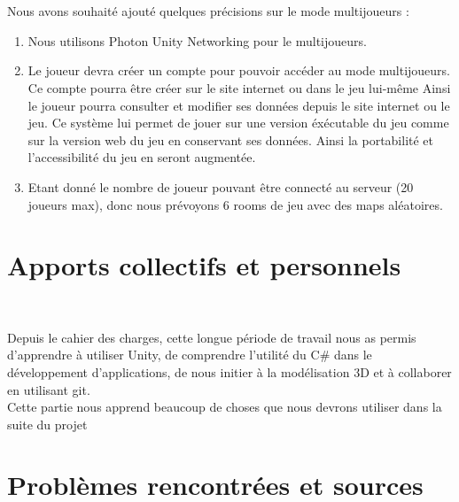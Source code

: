 \documentclass[titlepage, 13px, a4paper]{article}
\begin{document}
\paragraph{} \hspace{0pt} \\
Nous avons souhaité ajouté quelques précisions sur le mode multijoueurs :
\\
{\begin{enumerate}
	\item Nous utilisons Photon Unity Networking pour le multijoueurs.
		\\
	\item Le joueur devra créer un compte pour pouvoir accéder au mode multijoueurs.
			Ce compte pourra être créer sur le site internet ou dans le jeu lui-même
			Ainsi le joueur pourra consulter et modifier ses données depuis le site internet ou le jeu.
			Ce système lui permet de jouer sur une version éxécutable du jeu comme sur la version web du jeu en conservant ses données.
			Ainsi la portabilité et l'accessibilité du jeu en seront augmentée.
		\\
	\item Etant donné le nombre de joueur pouvant être connecté au serveur (20 joueurs max), donc nous prévoyons 6 rooms de jeu avec des maps aléatoires.
		\\
\end{enumerate}}


\part{Apports collectifs et personnels}
\paragraph{} \hspace{0pt} \\
Depuis le cahier des charges, cette longue période de travail nous as permis d'apprendre à utiliser Unity, 
de comprendre l'utilité du C\# dans le développement d'applications, de nous initier à la modélisation 3D et à collaborer en utilisant git.
\\
Cette partie nous apprend beaucoup de choses que nous devrons utiliser dans la suite du projet 

\newpage

\newpage
\part{Problèmes rencontrées et sources }
\end{document}
